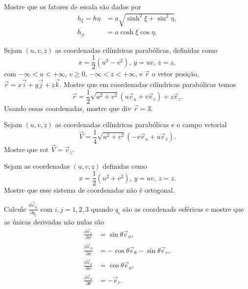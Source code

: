 \documentclass[a4paper,12pt,answers]{exam}
\newcommand{\devp}[2]{\frac{\partial #1}{\partial #2}}
\begin{document}
\begin{questions}
  Mostre que os fatores de escala s\~{a}o dados por
  \begin{align*}
	h_\xi = h\eta &= a \sqrt{\sinh^2 \xi + \sin^2 \eta}, \\
	h_\phi &= a \cosh \xi \cos \eta.
  \end{align*}
  \begin{solution}
	
  \end{solution}

  \question Sejam $(u, v, z)$ as coordenadas cil\'{i}ndricas parab\'{o}licas, definidas como
  \[
  x = \frac{1}{2} (u^2 - v^2), \ y = uv, \ z = z,
  \]
  com $-\infty < u < +\infty$, $v \geq 0$, $-\infty < z < +\infty$, e $\vec{r}$ o vetor posi\c{c}\~{a}o, $\vec{r} = x \vec{i} + y \vec{j} + z \vec{k}$. Mostre que em coordenadas cil\'{i}ndricas parab\'{o}licas temos
  \[
  \vec{r} = \frac{1}{2} \sqrt{u^2 + v^2} (u \vec{e}_u + v \vec{e}_v) + z \vec{e}_z.
  \]
  Usando essas coordenadas, mostre que $\mbox{div } \vec{r} = 3$.
  \begin{solution}
	
  \end{solution}

  \question Sejam $(u, v, z)$ as coordenadas cil\'{i}ndricas parab\'{o}licas e o campo vetorial
  \[
  \vec{V} = \frac{1}{4} \sqrt{u^2 + v^2} (-v \vec{e}_u + u \vec{e}_v).
  \]
  Mostre que $\mbox{rot } \vec{V} = \vec{e}_z$.
  \begin{solution}
	
  \end{solution}

  \question Sejam as coordenadas $(u, v, z)$ definidas como
  \[
  x = \frac{1}{2} (u^2 + v^2), \ y = uv, \ z = z.
  \]
  Mostre que esse sistema de coordenadas n\~{a}o \'{e} ortogonal.
  \begin{solution}
	
  \end{solution}

  \question Calcule $\devp{\vec{e}_{q_i}}{q_j}$ com $i, j = 1, 2, 3$ quando $q_i$ s\~{a}o as coordenads esf\'{e}ricas e mostre que as únicas derivadas n\~{a}o nulas s\~{a}o
  \begin{align*}
	\devp{\vec{e}_r}{\phi} &= \sin \theta \vec{e}_\phi, \\
	\devp{\vec{e}_\phi}{\phi} &= -\cos \theta \vec{e}_\theta - \sin \theta \vec{e}_r, \\
	\devp{\vec{e}_\theta}{\phi} &= \cos \theta \vec{e}_\phi, \\
	\devp{\vec{e}_\theta}{\theta} &= -\vec{e}_r.
  \end{align*}
  \begin{solution}
	

\end{solution}
\end{questions}
\end{document}
